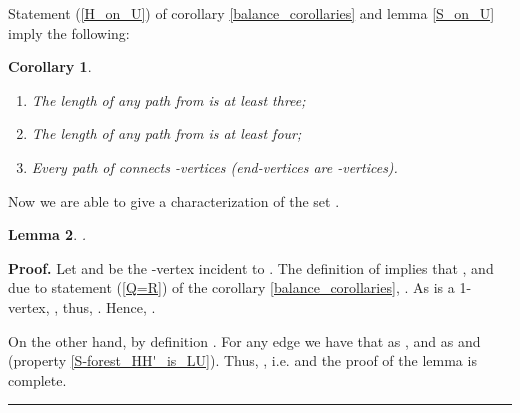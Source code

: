 \documentclass[a4paper, 12pt]{article}
\newtheorem{lemma}{Lemma}[subsection]
\newtheorem{corollary}[lemma]{Corollary}
\newenvironment{proof}[1][Proof]{\noindent\textbf{#1.} }{\ \rule{0.5em}{0.5em}}
\begin{document}
\bigskip

Statement (\ref{H_on_U}) of corollary \ref{balance_corollaries} and
lemma \ref{S_on_U} imply the following:
\begin{corollary}\label{paths_corollaries}\
\renewcommand{\labelenumi}{(\arabic{enumi})}
\begin{enumerate}
\item \label{length_at_least_3}
The length of any path from  is at least three;

\item \label{even_length_at_least_4}
The length of any path from  is at least four;

\item \label{every_path_is 1-1}
Every path of  connects -vertices (end-vertices are
-vertices).
\end{enumerate}
\end{corollary}

\bigskip

Now we are able to give a characterization of the set .
\begin{lemma} \label{H_in_U_is_TU}
.
\end{lemma}
\begin{proof}
Let  and  be the -vertex
incident to . The definition of  implies that , and due to statement (\ref{Q=R}) of the corollary
\ref{balance_corollaries}, . As  is a 1-vertex, , thus, . Hence, .

On the other hand, by definition . For any edge  we have
that  as , and  as  and
 (property \ref{S-forest_HH'_is_LU}). Thus, , i.e.  and the proof of the lemma is complete.
\end{proof}

\bigskip
\end{document}
